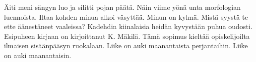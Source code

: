 Äiti meni sängyn luo ja silitti pojan päätä.
Näin viime yönä unta morfologian luennoista.
Iltaa kohden minua alkoi väsyttää.
Minun on kylmä.
Mistä syystä te ette äänestäneet vaaleissa?
Kadehdin kiinalaisia heidän kyvystään puhua oudosti.
Esipuheen kirjaan on kirjoittanut K. Mäkilä.
Tämä sopimus kieltää opiskelijoilta ilmaisen sisäänpääsyn ruokalaan.
Liike on auki maanantaista perjantaihin.
Liike on auki maanantaisin.
